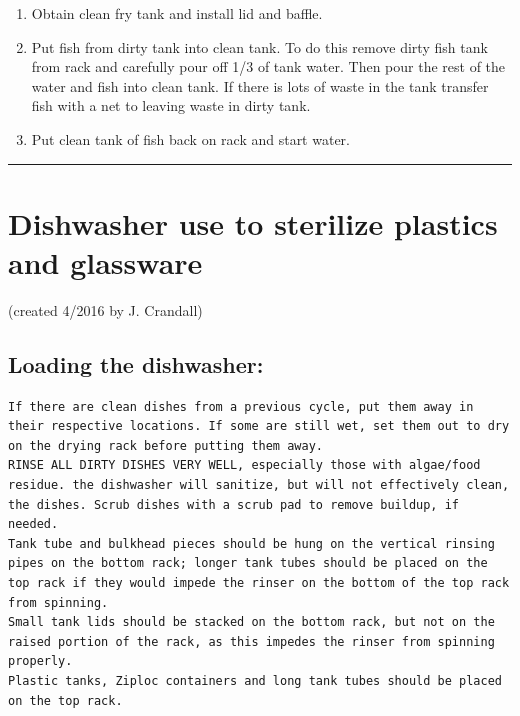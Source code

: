 \documentclass[
]{book}
\providecommand{\tightlist}{%
  \setlength{\itemsep}{0pt}\setlength{\parskip}{0pt}}
\begin{document}
\begin{enumerate}
\def\labelenumi{\arabic{enumi}.}
\tightlist
\item
  Obtain clean fry tank and install lid and baffle.
\item
  Put fish from dirty tank into clean tank. To do this remove dirty fish tank from rack and carefully pour off 1/3 of tank water. Then pour the rest of the water and fish into clean tank. If there is lots of waste in the tank transfer fish with a net to leaving waste in dirty tank.
\item
  Put clean tank of fish back on rack and start water.
\end{enumerate}

\begin{center}\rule{0.5\linewidth}{0.5pt}\end{center}

\hypertarget{dishwasher-use-to-sterilize-plastics-and-glassware}{%
\section{Dishwasher use to sterilize plastics and glassware}\label{dishwasher-use-to-sterilize-plastics-and-glassware}}

(created 4/2016 by J. Crandall)

\hypertarget{loading-the-dishwasher}{%
\subsection{Loading the dishwasher:}\label{loading-the-dishwasher}}

\begin{verbatim}
If there are clean dishes from a previous cycle, put them away in their respective locations. If some are still wet, set them out to dry on the drying rack before putting them away. 
RINSE ALL DIRTY DISHES VERY WELL, especially those with algae/food residue. the dishwasher will sanitize, but will not effectively clean, the dishes. Scrub dishes with a scrub pad to remove buildup, if needed. 
Tank tube and bulkhead pieces should be hung on the vertical rinsing pipes on the bottom rack; longer tank tubes should be placed on the top rack if they would impede the rinser on the bottom of the top rack from spinning. 
Small tank lids should be stacked on the bottom rack, but not on the raised portion of the rack, as this impedes the rinser from spinning properly.
Plastic tanks, Ziploc containers and long tank tubes should be placed on the top rack.
\end{verbatim}
\end{document}
